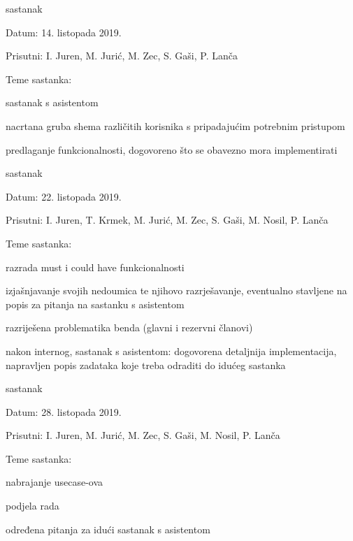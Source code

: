 \begin{packed_enum}
			\item  sastanak
			\item[] \begin{packed_item}
				\item Datum: 14. listopada 2019.
				\item Prisutni: I. Juren, M. Jurić, M. Zec, S. Gaši, P. Lanča
				\item Teme sastanka:
				\begin{packed_item}
					\item  sastanak s asistentom
					\item  nacrtana gruba shema različitih korisnika s pripadajućim potrebnim pristupom
					\item  predlaganje funkcionalnosti, dogovoreno što se obavezno mora implementirati 
				\end{packed_item}
			\end{packed_item}
			
			\item  sastanak
			\item[] \begin{packed_item}
				\item Datum: 22. listopada 2019.
				\item Prisutni: I. Juren, T. Krmek, M. Jurić, M. Zec, S. Gaši, M. Nosil, P. Lanča
				\item Teme sastanka:
				\begin{packed_item}
					\item  razrada must i could have funkcionalnosti
					\item  izjašnjavanje svojih nedoumica te njihovo razrješavanje, eventualno stavljene na popis za pitanja na sastanku s asistentom
					\item  razriješena problematika benda (glavni i rezervni članovi)
					\item  nakon internog, sastanak s asistentom: dogovorena detaljnija implementacija, napravljen popis zadataka koje treba odraditi do idućeg sastanka
				\end{packed_item}
			\end{packed_item}
			
			\item  sastanak
			\item[] \begin{packed_item}
				\item Datum: 28. listopada 2019.
				\item Prisutni: I. Juren, M. Jurić, M. Zec, S. Gaši, M. Nosil, P. Lanča
				\item Teme sastanka:
				\begin{packed_item}
					\item  nabrajanje usecase-ova
					\item  podjela rada
					\item  određena pitanja za idući sastanak s asistentom
				\end{packed_item}
			\end{packed_item}
			

\end{packed_enum}
